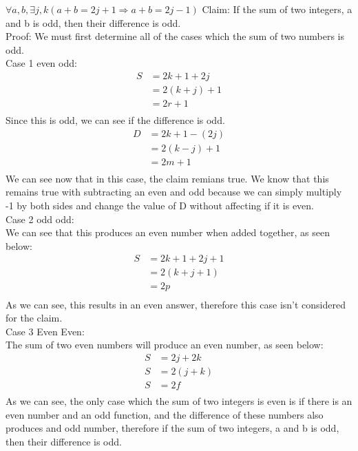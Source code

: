 \documentclass{letter}
\theoremstyle{definition}
\begin{document}
\begin{description}
\begin{enumerate}
$\forall a,b, \exists j,k (a+b=2j+1 \Rightarrow a+b=2j-1)$
Claim: If the sum of two integers, a and b is odd, then their difference is odd. \\
Proof: We must first determine all of the cases which the sum of two numbers is odd.\\
Case 1 even odd: \\
\begin{align*}
S &= 2k+1+2j \\
&= 2(k+j)+1 \tag{Factored out two} \\
&= 2r+1 \tag{Set r=k+j} \\
\end{align*}
Since this is odd, we can see if the difference is odd. \\
\begin{align*}
D &= 2k+1-(2j) \\
&= 2(k-j)+1 \tag{Factor out 2} \\
&= 2m+1 \tag{Set k-j equal to m} \\
\end{align*} 
We can see now that in this case, the claim remians true. We know that this remains true with subtracting an even and odd because we can simply multiply -1 by both sides and change the value of D without affecting if it is even. \\
Case 2 odd odd: \\
We can see that this produces an even number when added together, as seen below: \\
\begin{align*}
S &= 2k+1+2j+1 \\
&=2(k+j+1) \tag{Factored out the 2}\\
&= 2p \tag{set p as k+j+1} \\
\end{align*}
As we can see, this results in an even answer, therefore this case isn't considered for the claim. \\
Case 3 Even Even: \\
The sum of two even numbers will produce an even number, as seen below:
\begin{align*}
S &= 2j+2k \\
S &= 2(j+k) \tag{Factored out 2} \\
S &= 2f \tag{Set f equal to j+k} \\
\end{align*}
As we can see, the only case which the sum of two integers is even is if there is an even number and an odd function, and the difference of these numbers also produces and odd number, therefore if the sum of two integers, a and b is odd, then their difference is odd.







\end{enumerate}
\end{description}
\end{document}
